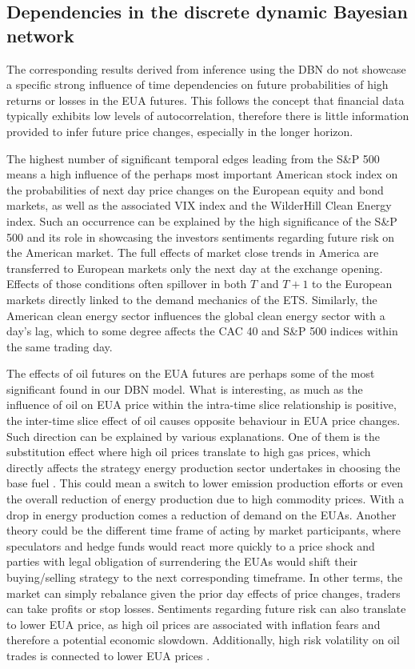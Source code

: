 \documentclass[12pt, letterpaper]{article}
\begin{document}
\subsection{Dependencies in the discrete dynamic Bayesian network}

The corresponding results derived from inference using the DBN do not showcase a specific strong influence of time dependencies on future probabilities of high returns or losses in the EUA futures. This follows the concept that financial data typically exhibits low levels of autocorrelation, therefore there is little information provided to infer future price changes, especially in the longer horizon.

The highest number of significant temporal edges leading from the S\&P 500 means a high influence of the perhaps most important American stock index on the probabilities of next day price changes on the European equity and bond markets, as well as the associated VIX index and the WilderHill Clean Energy index. Such an occurrence can be explained by the high significance of the S\&P 500 and its role in showcasing the investors sentiments regarding future risk on the American market. The full effects of market close trends in America are transferred to European markets only the next day at the exchange opening. Effects of those conditions often spillover in both $T$ and $T+1$ to the European markets directly linked to the demand mechanics of the ETS.  Similarly, the American clean energy sector influences the global clean energy sector with a day’s lag, which to some degree affects the CAC 40 and S\&P 500 indices within the same trading day.

The effects of oil futures on the EUA futures are perhaps some of the most significant found in our DBN model. What is interesting, as much as the influence of oil on EUA price within the intra-time slice relationship is positive, the inter-time slice effect of oil causes opposite behaviour in EUA price changes. Such direction can be explained by various explanations. One of them is the substitution effect where high oil prices translate to high gas prices, which directly affects the strategy energy production sector undertakes in choosing the base fuel \parencite{lovcha2021}. This could mean a switch to lower emission production efforts or even the overall reduction of energy production due to high commodity prices. With a drop in energy production comes a reduction of demand on the EUAs. Another theory could be the different time frame of acting by market participants, where speculators and hedge funds would react more quickly to a price shock and parties with legal obligation of surrendering the EUAs would shift their buying/selling strategy to the next corresponding timeframe. In other terms, the market can simply rebalance given the prior day effects of price changes, traders can take profits or stop losses. Sentiments regarding future risk can also translate to lower EUA price, as high oil prices are associated with inflation fears and therefore a potential economic slowdown. Additionally, high risk volatility on oil trades is connected to lower EUA prices \parencite{zheng2021}.
\end{document}
